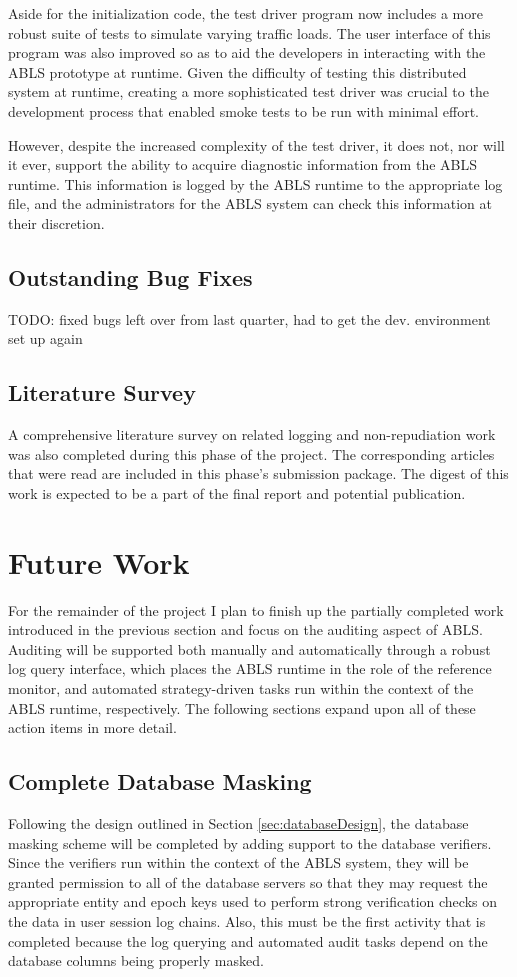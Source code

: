 \documentclass{sig-alternate}
\begin{document}
Aside for the initialization code, the test driver program now includes a more robust suite of tests to simulate varying traffic 
loads. The user interface of this program was also improved so as to aid the developers in interacting with the ABLS 
prototype at runtime. Given the difficulty of testing this distributed system at runtime, creating a more sophisticated
test driver was crucial to the development process that enabled smoke tests to be run with minimal effort.

However, despite the increased complexity of the test driver, it does not, nor will it ever, support the ability to acquire 
diagnostic information from the ABLS runtime. This information is logged by the ABLS runtime to the appropriate log 
file, and the administrators for the ABLS system can check this information at their discretion.

\subsection{Outstanding Bug Fixes}
TODO: fixed bugs left over from last quarter, had to get the dev. environment set up again

\subsection{Literature Survey}
A comprehensive literature survey on related logging and non-repudiation work was also completed during this phase 
of the project. The corresponding articles that were read are included in this phase's submission package. The digest of this work is expected to be a part of the final report and potential publication.

\section{Future Work}
For the remainder of the project I plan to finish up the partially completed work introduced in the previous section and 
focus on the auditing aspect of ABLS. Auditing will be supported both manually and automatically through
a robust log query interface, which places the ABLS runtime in the role of the reference monitor, and automated
strategy-driven tasks run within the context of the ABLS runtime, respectively. The following sections expand upon all
of these action items in more detail.

\subsection{Complete Database Masking}
Following the design outlined in Section \ref{sec:databaseDesign}, the database masking scheme will be completed by
adding support to the database verifiers. Since the verifiers run within the context of the ABLS system, they will be granted
permission to all of the database servers so that they may request the appropriate entity and epoch keys used to perform
strong verification checks on the data in user session log chains. Also, this must be the first activity that is completed 
because the log querying and automated audit tasks depend on the database columns being properly masked. 
\end{document}

